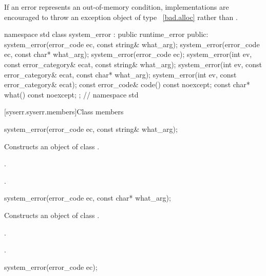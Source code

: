 \pnum
\enternote If an error represents an out-of-memory condition, implementations are
encouraged to throw an exception object of type ~\ref{bad.alloc} rather
than . \exitnote

%
\begin{codeblock}
namespace std {
  class system_error : public runtime_error {
  public:
    system_error(error_code ec, const string& what_arg);
    system_error(error_code ec, const char* what_arg);
    system_error(error_code ec);
    system_error(int ev, const error_category& ecat,
        const string& what_arg);
    system_error(int ev, const error_category& ecat,
        const char* what_arg);
    system_error(int ev, const error_category& ecat);
    const error_code& code() const noexcept;
    const char* what() const noexcept;
  };
}   // namespace std
\end{codeblock}

[syserr.syserr.members]{Class  members}

\begin{itemdecl}
system_error(error_code ec, const string& what_arg);
\end{itemdecl}

\begin{itemdescr}
\pnum
\effects Constructs an object of class .

\pnum
\postconditions {}.

.
\end{itemdescr}

\begin{itemdecl}
system_error(error_code ec, const char* what_arg);
\end{itemdecl}

\begin{itemdescr}
\pnum
\effects Constructs an object of class .

\pnum
\postconditions {}.

.
\end{itemdescr}

\begin{itemdecl}
system_error(error_code ec);
\end{itemdecl}

